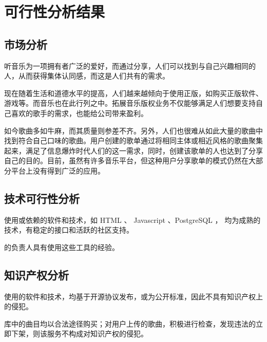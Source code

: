 \chapter{可行性分析结果}

\section{市场分析}

听音乐为一项拥有者广泛的爱好，而通过分享，人们可以找到与自己兴趣相同的人，从而获得集体认同感，而这是人们共有的需求。

现在随着生活和道德水平的提高，人们越来越倾向于使用正版，如购买正版软件、游戏等。而音乐也在此行列之中。拓展音乐版权业务不仅能够满足人们想要支持自己喜欢的歌手的需求，也能给公司带来盈利。

如今歌曲多如牛麻，而其质量则参差不齐。另外，人们也很难从如此大量的歌曲中找到符合自己口味的歌曲。用户创建的歌单通过将相同主体或相近风格的歌曲聚集起来，满足了信息爆炸时代人们的这一需求，同时，创建该歌单的人也达到了分享自己的目的。目前，虽然有许多音乐平台，但这种用户分享歌单的模式仍然在大部分平台上没有得到广泛的应用。

\section{技术可行性分析}

\proname 使用或依赖的软件和技术，如 HTML 、 Javascript 、PostgreSQL ， 均为成熟的技术，有稳定的接口和活跃的社区支持。

\proname 的负责人具有使用这些工具的经验。

\section{知识产权分析}

\proname 使用的软件和技术，均基于开源协议发布，或为公开标准，因此不具有知识产权上的侵犯。

库中的曲目均以合法途径购买；对用户上传的歌曲，积极进行检查，发现违法的立即下架，则该服务不构成对知识产权的侵犯。

